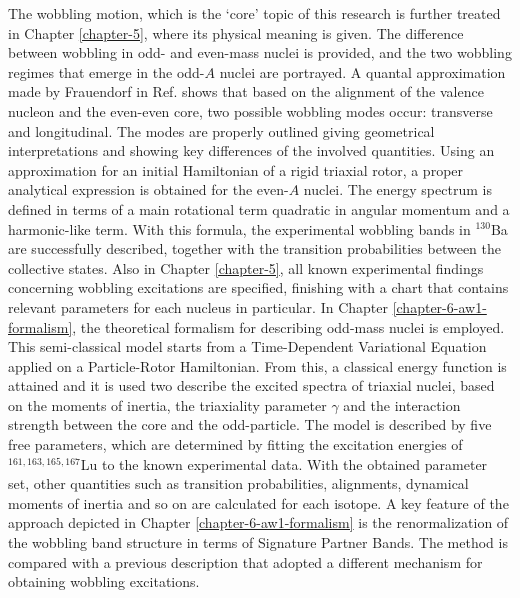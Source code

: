 The wobbling motion, which is the `core' topic of this research is further treated in Chapter \ref{chapter-5}, where its physical meaning is given. The difference between wobbling in odd- and even-mass nuclei is provided, and the two wobbling regimes that emerge in the odd-$A$ nuclei are portrayed. A quantal approximation made by Frauendorf in Ref. \cite{frauendorf2014transverse} shows that based on the alignment of the valence nucleon and the even-even core, two possible wobbling modes occur: transverse and longitudinal. The modes are properly outlined giving geometrical interpretations and showing key differences of the involved quantities. Using an approximation for an initial Hamiltonian of a rigid triaxial rotor, a proper analytical expression is obtained for the even-$A$ nuclei. The energy spectrum is defined in terms of a main rotational term quadratic in angular momentum and a harmonic-like term. With this formula, the experimental wobbling bands in $^{130}$Ba are successfully described, together with the transition probabilities between the collective states. Also in Chapter \ref{chapter-5}, all known experimental findings concerning wobbling excitations are specified, finishing with a chart that contains relevant parameters for each nucleus in particular. In Chapter \ref{chapter-6-aw1-formalism}, the theoretical formalism for describing odd-mass nuclei is employed. This semi-classical model starts from a Time-Dependent Variational Equation applied on a Particle-Rotor Hamiltonian. From this, a classical energy function is attained and it is used two describe the excited spectra of triaxial nuclei, based on the moments of inertia, the triaxiality parameter $\gamma$ and the interaction strength between the core and the odd-particle. The model is described by five free parameters, which are determined by fitting the excitation energies of $^{161,163,165,167}$Lu to the known experimental data. With the obtained parameter set, other quantities such as transition probabilities, alignments, dynamical moments of inertia and so on are calculated for each isotope. A key feature of the approach depicted in Chapter \ref{chapter-6-aw1-formalism} is the renormalization of the wobbling band structure in terms of Signature Partner Bands. The method is compared with a previous description that adopted a different mechanism for obtaining wobbling excitations.

